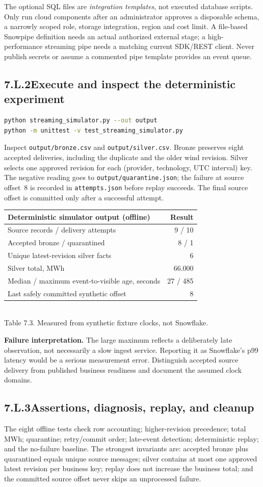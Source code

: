 \documentclass[11pt,twoside]{article}
\newcommand{\topic}[2]{\subsection*{#1\quad #2}}
\begin{document}
The optional SQL files are \emph{integration templates}, not executed database scripts. Only run cloud components after an administrator approves a disposable schema, a narrowly scoped role, storage integration, region and cost limit. A file-based Snowpipe definition needs an actual authorized external stage; a high-performance streaming pipe needs a matching current SDK/REST client. Never publish secrets or assume a commented pipe template provides an event queue.
\topic{7.L.2}{Execute and inspect the deterministic experiment}
\begin{lstlisting}[language=bash,caption={From the extracted Chapter 7 lab folder.}]
python streaming_simulator.py --out output
python -m unittest -v test_streaming_simulator.py
\end{lstlisting}
Inspect \texttt{output/bronze.csv} and \texttt{output/silver.csv}. Bronze preserves eight accepted deliveries, including the duplicate and the older wind revision. Silver selects one approved revision for each (provider, technology, UTC interval) key. The negative reading goes to \texttt{output/quarantine.json}; the failure at source offset~8 is recorded in \texttt{attempts.json} before replay succeeds. The final source offset is committed only after a successful attempt.
\begin{center}\renewcommand{\arraystretch}{1.13}\begin{tabularx}{\linewidth}{@{}Xr@{}}\toprule
\textbf{Deterministic simulator output (offline)}&\textbf{Result}\\\midrule
Source records / delivery attempts&9 / 10\\
Accepted bronze / quarantined&8 / 1\\
Unique latest-revision silver facts&6\\
Silver total, MWh&66.000\\
Median / maximum event-to-visible age, seconds&27 / 485\\
Last safely committed synthetic offset&8\\\bottomrule
\end{tabularx}\\{\fontsize{8}{9.5}\selectfont\color{inkgray}Table 7.3. Measured from synthetic fixture clocks, not Snowflake.}\end{center}
\textbf{Failure interpretation.} The large maximum reflects a deliberately late observation, not necessarily a slow ingest service. Reporting it as Snowflake's p99 latency would be a serious measurement error. Distinguish accepted source delivery from published business readiness and document the assumed clock domains.
\newpage
\topic{7.L.3}{Assertions, diagnosis, replay, and cleanup}
The eight offline tests check row accounting; higher-revision precedence; total MWh; quarantine; retry/commit order; late-event detection; deterministic replay; and the no-failure baseline. The strongest invariants are: accepted bronze plus quarantined equals unique source messages; silver contains at most one approved latest revision per business key; replay does not increase the business total; and the committed source offset never skips an unprocessed failure.
\end{document}
